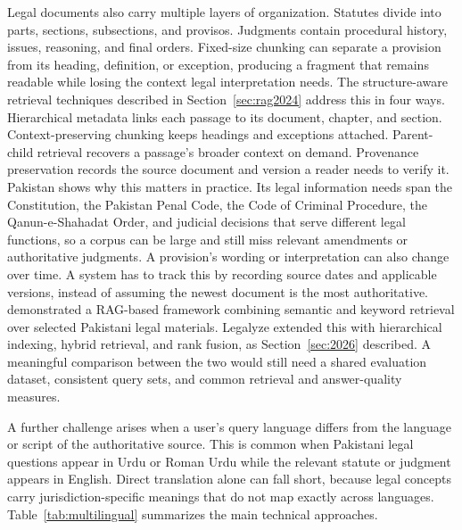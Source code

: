 Legal documents also carry multiple layers of organization. Statutes divide into parts, sections,
subsections, and provisos. Judgments contain procedural history, issues, reasoning, and final
orders. Fixed-size chunking can separate a provision from its heading, definition, or exception,
producing a fragment that remains readable while losing the context legal interpretation needs. The
structure-aware retrieval techniques described in Section~\ref{sec:rag2024} address this in four
ways. Hierarchical metadata links each passage to its document, chapter, and section.
Context-preserving chunking keeps headings and exceptions attached. Parent-child retrieval recovers
a passage's broader context on demand. Provenance preservation records the source document and
version a reader needs to verify it. Pakistan shows why this matters in practice. Its legal
information needs span the Constitution, the Pakistan Penal Code, the Code of Criminal Procedure,
the Qanun-e-Shahadat Order, and judicial decisions that serve different legal functions, so a corpus
can be large and still miss relevant amendments or authoritative judgments. A provision's wording or
interpretation can also change over time. A system has to track this by recording source dates and
applicable versions, instead of assuming the newest document is the most authoritative.
\citet{ref312025} demonstrated a RAG-based framework combining semantic and keyword retrieval over
selected Pakistani legal materials. Legalyze \citep{hamza2026} extended this with hierarchical
indexing, hybrid retrieval, and rank fusion, as Section~\ref{sec:2026} described. A meaningful
comparison between the two would still need a shared evaluation dataset, consistent query sets, and
common retrieval and answer-quality measures.

A further challenge arises when a user's query language differs from the language or script of the
authoritative source. This is common when Pakistani legal questions appear in Urdu or Roman Urdu
while the relevant statute or judgment appears in English. Direct translation alone can fall short,
because legal concepts carry jurisdiction-specific meanings that do not map exactly across
languages. Table~\ref{tab:multilingual} summarizes the main technical approaches.

